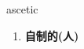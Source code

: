 
\begin{frame}
{\huge ascetic}
\begin{center}
\begin{enumerate}\Large
  \item \textbf{自制的(人)}
\end{enumerate}
\end{center}
\end{frame}
